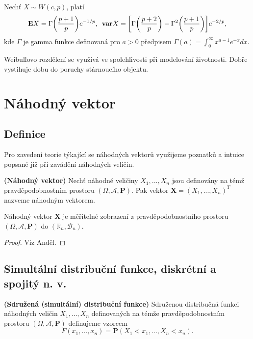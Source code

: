 \begin{proposition}
Nechť $X \sim W(c, p)$, platí
\begin{equation}
\mathbf{E}X = \Gamma\bigg( \frac{p + 1}{p} \bigg) c^{-1/p}, \enskip \mathbf{var}X = \bigg[ \Gamma \bigg( \frac{p+2}{p}\bigg) - \Gamma^{2} \bigg( \frac{p + 1}{p}\bigg) \bigg] c^{-2/p}, 
\end{equation}
kde $\Gamma$ je gamma funkce definovaná pro $a>0$ předpisem $\Gamma(a) = \int_{0}^{\infty} x^{a - 1}e^{-x}dx.$
\end{proposition}

\begin{remark}
Weibullovo rozdělení se využívá ve spolehlivosti při modelování životnosti. Dobře vystihuje dobu do poruchy stárnoucího objektu.
\end{remark}

\section{Náhodný vektor}
\subsection{Definice}
Pro zavedení teorie týkající se náhodných vektorů využijeme poznatků a intuice popsané již při zavádění náhodných veličin.
\begin{definition}{\textbf{(Náhodný vektor)}}
Nechť náhodné veličiny $X_{1}, ..., X_{n}$ jsou definovány na témž pravděpodobnostním prostoru $(\Omega, \mathcal{A}, \textbf{P})$. Pak vektor $\textbf{X} = (X_{1}, ..., X_{n})^{T}$ nazveme náhodným vektorem. 
\end{definition}
\begin{theorem}
Náhodný vektor $\textbf{X}$ je měřitelné zobrazení z pravděpodobnostního prostoru $(\Omega, \mathcal{A}, \textbf{P})$ do $(\mathbb{R}_{n}, \mathcal{B}_{n})$.
\end{theorem}
\begin{proof}
Viz Anděl.
\end{proof}
\subsection{Simultální distribuční funkce, diskrétní a spojitý n. v.}
\begin{definition}{\textbf{(Sdružená (simultální) distribuční funkce)}}
Sdruženou distribučná funkci náhodných veličin $X_{1}, ..., X_{n}$ definovaných na témže pravděpodobnostním prostoru $(\Omega, \mathcal{A}, \textbf{P})$ definujeme vzorcem
\begin{equation}
F(x_{1}, ..., x_{n}) = \textbf{P}(X_{1} < x_{1}, ..., X_{n} < x_{n}).
\end{equation}
\end{definition}

